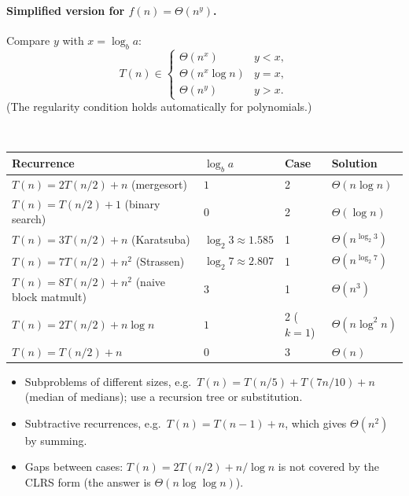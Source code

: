 \paragraph{Simplified version for $f(n)=\Theta(n^y)$.} Compare $y$ with $x=\log_b a$:
\[
T(n)\in\begin{cases}
\Theta(n^x) & y<x,\\
\Theta(n^x\log n) & y=x,\\
\Theta(n^y) & y>x.
\end{cases}
\]
(The regularity condition holds automatically for polynomials.)

\begin{example}\
\begin{center}
\begin{tabular}{llll}
\toprule
Recurrence & $\log_b a$ & Case & Solution \\
\midrule
$T(n)=2T(n/2)+n$ (mergesort) & $1$ & 2 & $\Theta(n\log n)$ \\
$T(n)=T(n/2)+1$ (binary search) & $0$ & 2 & $\Theta(\log n)$ \\
$T(n)=3T(n/2)+n$ (Karatsuba) & $\log_2 3\approx1.585$ & 1 & $\Theta(n^{\log_2 3})$ \\
$T(n)=7T(n/2)+n^2$ (Strassen) & $\log_2 7\approx2.807$ & 1 & $\Theta(n^{\log_2 7})$ \\
$T(n)=8T(n/2)+n^2$ (naive block matmult) & $3$ & 1 & $\Theta(n^3)$ \\
$T(n)=2T(n/2)+n\log n$ & $1$ & 2 ($k=1$) & $\Theta(n\log^2n)$ \\
$T(n)=T(n/2)+n$ & $0$ & 3 & $\Theta(n)$ \\
\bottomrule
\end{tabular}
\end{center}
\end{example}

\begin{important}
\begin{itemize}
  \item Subproblems of different sizes, e.g.\ $T(n)=T(n/5)+T(7n/10)+n$ (median of medians); use a recursion tree or substitution.
  \item Subtractive recurrences, e.g.\ $T(n)=T(n-1)+n$, which gives $\Theta(n^2)$ by summing.
  \item Gaps between cases: $T(n)=2T(n/2)+n/\log n$ is not covered by the CLRS form (the answer is $\Theta(n\log\log n)$).
\end{itemize}
\end{important}

